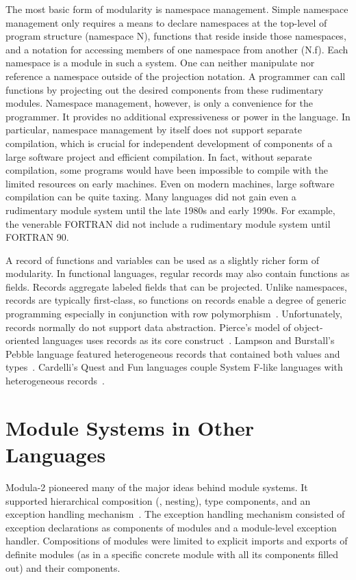 The most basic form of modularity is namespace management. Simple namespace management only requires a means to declare namespaces at the top-level of program structure (namespace N), functions that reside inside those namespaces, and a notation for accessing members of one namespace from another (N.f). Each namespace is a module in such a system. One can neither manipulate nor reference a namespace outside of the projection notation. A programmer can call functions by projecting out the desired components from these rudimentary modules. Namespace management, however, is only a convenience for the programmer. It provides no additional expressiveness or power in the language. In particular, namespace management by itself does not support separate compilation, which is crucial for independent development of components of a large software project and efficient compilation. In fact, without separate compilation, some programs would have been impossible to compile with the limited resources on early machines. Even on modern machines, large software compilation can be quite taxing. Many languages did not gain even a rudimentary module system until the late 1980s and early 1990s. For example, the venerable FORTRAN did not include a rudimentary module system until FORTRAN 90. 

A record of functions and variables can be used as a slightly richer form of modularity. In functional languages, regular records may also contain functions as fields. Records aggregate labeled fields that can be projected. Unlike namespaces, records are typically first-class, so functions on records enable a degree of generic programming especially in conjunction with row polymorphism~\cite{remy:popl89}. Unfortunately, records normally do not support data abstraction. Pierce's model of object-oriented languages uses records as its core construct~\cite{Pierce:TypeSystems}. Lampson and Burstall's Pebble language featured heterogeneous records that contained both values and types~\cite{lampsonburstall88}. Cardelli's Quest and Fun languages couple System F-like languages with heterogeneous records~\cite{cardelli:tp}. 

\section{Module Systems in Other Languages}
Modula-2 pioneered many of the major ideas behind module systems. It supported hierarchical composition (\ie, nesting), type components, and an exception handling mechanism~\cite{wirth:module}. The exception handling mechanism consisted of exception declarations as components of modules and a module-level exception handler. Compositions of modules were limited to explicit imports and exports of definite modules (as in a specific concrete module with all its components filled out) and their components. 

